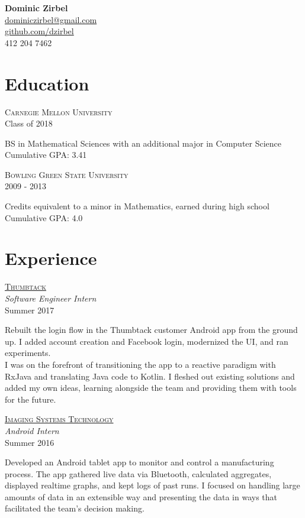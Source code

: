 \documentclass[letterpaper,10pt]{article}
\newcommand{\lb}{\vspace{4pt} \\}
\newenvironment{resumecols2}[2]
{
    \vspace{.1cm}
    \begin{minipage}[t]{.21\linewidth}
        \begin{flushright}
            \textsc{#1} \\
            \small{#2}
        \end{flushright}
    \end{minipage}
    \hspace{.005\linewidth}
    \begin{minipage}[t]{.77\linewidth}
}
{
    \end{minipage}
    \vspace{.1cm}
}
\newenvironment{resumecols}[4]
{
    \vspace{.1cm}
    \begin{minipage}[t]{.21\linewidth}
        \begin{flushright}
            \href{#2}{\textsc{#1}} \\
            \small{\textit{#3}} \\
            \small{#4}
        \end{flushright}
    \end{minipage}
    \hspace{.005\linewidth}
    \begin{minipage}[t]{.77\linewidth}
}
{
    \end{minipage}
    \vspace{.1cm}
}
\begin{document}
\thispagestyle{empty}

\begin{flushright}
    \textbf{\Large{Dominic Zirbel}} \\
    \href{mailto:dominiczirbel@gmail.com}{dominiczirbel@gmail.com} \\
    \href{https://github.com/dzirbel}{github.com/dzirbel} \\
    412 204 7462
\end{flushright}

\section{Education}

\begin{resumecols2}{Carnegie Mellon University}{Class of 2018}
    BS in Mathematical Sciences with an additional major in Computer Science
    \lb
    Cumulative GPA: 3.41
\end{resumecols2}

\begin{resumecols2}{Bowling Green State University}{2009 - 2013}
    Credits equivalent to a minor in Mathematics, earned during high school
    \lb
    Cumulative GPA: 4.0
\end{resumecols2}

\section{Experience}

\begin{resumecols}{Thumbtack}{https://www.thumbtack.com/about}{Software Engineer Intern}{Summer 2017}
    Rebuilt the login flow in the Thumbtack customer Android app from the ground up. I added account creation and Facebook login, modernized the UI, and ran experiments.
    \lb
    I was on the forefront of transitioning the app to a reactive paradigm with RxJava and translating Java code to Kotlin. I fleshed out existing solutions and added my own ideas, learning alongside the team and providing them with tools for the future.
\end{resumecols}

\begin{resumecols}{Imaging Systems Technology}{http://www.teamist.com}{Android Intern}{Summer 2016}
    Developed an Android tablet app to monitor and control a manufacturing process. The app gathered live data via Bluetooth, calculated aggregates, displayed realtime graphs, and kept logs of past runs. I focused on handling large amounts of data in an extensible way and presenting the data in ways that facilitated the team's decision making.
\end{resumecols}
\end{document}
